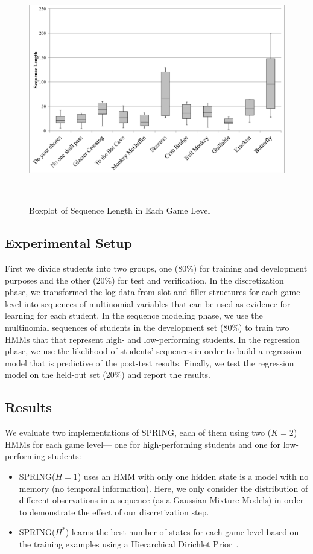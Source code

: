 \documentclass{sigchi}
\def\algname{SPRING\xspace}
\begin{document}
	\begin{figure}
		\centering
		\includegraphics[width=0.9\columnwidth]{figures/boxplot.pdf}
		\caption{Boxplot of Sequence Length in Each Game Level}~\label{fig:boxplot}
	\end{figure}
		
	\subsection{Experimental Setup}
	First we divide students into two groups, one (80\%) for training and development purposes and the other (20\%) for test and verification.
	In the discretization phase, we transformed the log data from slot-and-filler structures for each game level into sequences of multinomial variables that can be used as evidence for learning for each student.
	In the sequence modeling phase, we use the multinomial sequences of students in the development set (80\%) to train two HMMs that that represent high- and low-performing students.
	In the regression phase, we use the likelihood of students' sequences in order to build a regression model that is predictive of the post-test results.
	Finally, we test the regression model on the held-out set (20\%) and report the results.
	
	\subsection{Results}
	
	
	We evaluate two implementations of SPRING, each of them using two ($K=2$) HMMs for each game level--- one for high-performing students and one for low-performing students:
	\begin{itemize}
		\item \algname ($H=1$)  uses an HMM with only one hidden state is a model with no memory (no temporal information).
		Here, we only consider the distribution of different observations in a sequence (as a Gaussian Mixture Models) in order to demonstrate the effect of our discretization step.
		\item \algname ($H^*$) learns the best number of states for each game level based on the training examples using a Hierarchical Dirichlet Prior~\cite{fox2008hdp}.
	\end{itemize} 
	
\end{document}
